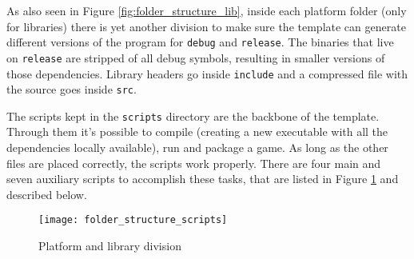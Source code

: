 As also seen in Figure \ref{fig:folder_structure_lib}, inside each platform folder (only for libraries) there is yet another division to make sure the template can generate different versions of the program for \texttt{debug} and \texttt{release}. The binaries that live on \texttt{release} are stripped of all debug symbols, resulting in smaller versions of those dependencies. Library headers go inside \texttt{include} and a compressed file with the source goes inside \texttt{src}.


The scripts kept in the \texttt{scripts} directory are the backbone of the template. Through them it's possible to compile (creating a new executable with all the dependencies locally available), run and package a game. As long as the other files are placed correctly, the scripts work properly. There are four main and seven auxiliary scripts to accomplish these tasks, that are listed in Figure \ref{fig:folder_structure_scripts} and described below.

\begin{figure}[h!]
\centering
\texttt{[image: folder\_structure\_scripts]}
\caption{Platform and library division}
\label{fig:folder_structure_scripts}
\end{figure}

